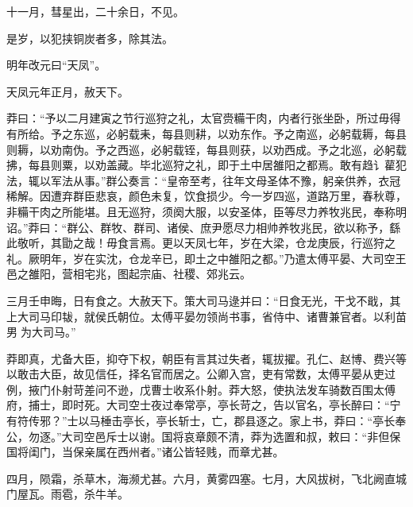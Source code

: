 \documentclass[12pt,UTF8]{ctexbook}
\begin{document}
十一月，彗星出，二十余日，不见。



是岁，以犯挟铜炭者多，除其法。



明年改元曰“天凤”。



天凤元年正月，赦天下。



莽曰：“予以二月建寅之节行巡狩之礼，太官赍糒干肉，内者行张坐卧，所过毋得有所给。予之东巡，必躬载耒，每县则耕，以劝东作。予之南巡，必躬载耨，每县则耨，以劝南伪。予之西巡，必躬载铚，每县则获，以劝西成。予之北巡，必躬载拂，每县则粟，以劝盖藏。毕北巡狩之礼，即于土中居雒阳之都焉。敢有趋讠雚犯法，辄以军法从事。”群公奏言：“皇帝至考，往年文母圣体不豫，躬亲供养，衣冠稀解。因遭弃群臣悲哀，颜色未复，饮食损少。今一岁四巡，道路万里，春秋尊，非糒干肉之所能堪。且无巡狩，须阕大服，以安圣体，臣等尽力养牧兆民，奉称明诏。”莽曰：“群公、群牧、群司、诸侯、庶尹愿尽力相帅养牧兆民，欲以称予，繇此敬听，其勖之哉！毋食言焉。更以天凤七年，岁在大梁，仓龙庚辰，行巡狩之礼。厥明年，岁在实沈，仓龙辛已，即土之中雒阳之都。”乃遣太傅平晏、大司空王邑之雒阳，营相宅兆，图起宗庙、社稷、郊兆云。



三月壬申晦，日有食之。大赦天下。策大司马逯并曰：“日食无光，干戈不戢，其上大司马印韨，就侯氏朝位。太傅平晏勿领尚书事，省侍中、诸曹兼官者。以利苗男为大司马。”



莽即真，尤备大臣，抑夺下权，朝臣有言其过失者，辄拔擢。孔仁、赵博、费兴等以敢击大臣，故见信任，择名官而居之。公卿入宫，吏有常数，太傅平晏从吏过例，掖门仆射苛差问不逊，戊曹士收系仆射。莽大怒，使执法发车骑数百围太傅府，捕士，即时死。大司空士夜过奉常亭，亭长苛之，告以官名，亭长醉曰：“宁有符传邪？”士以马棰击亭长，亭长斩士，亡，郡县逐之。家上书，莽曰：“亭长奉公，勿逐。”大司空邑斥士以谢。国将哀章颇不清，莽为选置和叔，敕曰：“非但保国将闺门，当保亲属在西州者。”诸公皆轻贱，而章尤甚。



四月，陨霜，杀草木，海濒尤甚。六月，黄雾四塞。七月，大风拔树，飞北阙直城门屋瓦。雨雹，杀牛羊。
\end{document}

